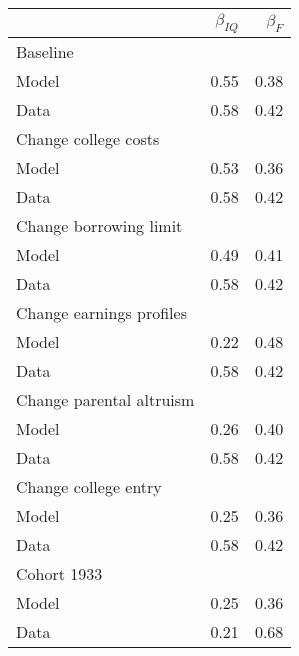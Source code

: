\begin{tabular}{lrr}
\hline
  & $\beta_{IQ}$  & $\beta_{F}$  \\ 
\hline
Baseline &   &   \\ 
Model & 0.55  & 0.38  \\ 
Data & 0.58  & 0.42  \\ 
Change college costs &   &   \\ 
Model & 0.53  & 0.36  \\ 
Data & 0.58  & 0.42  \\ 
Change borrowing limit &   &   \\ 
Model & 0.49  & 0.41  \\ 
Data & 0.58  & 0.42  \\ 
Change earnings profiles &   &   \\ 
Model & 0.22  & 0.48  \\ 
Data & 0.58  & 0.42  \\ 
Change parental altruism &   &   \\ 
Model & 0.26  & 0.40  \\ 
Data & 0.58  & 0.42  \\ 
Change college entry &   &   \\ 
Model & 0.25  & 0.36  \\ 
Data & 0.58  & 0.42  \\ 
Cohort 1933 &   &   \\ 
Model & 0.25  & 0.36  \\ 
Data & 0.21  & 0.68  \\ 
\hline
\end{tabular}%
